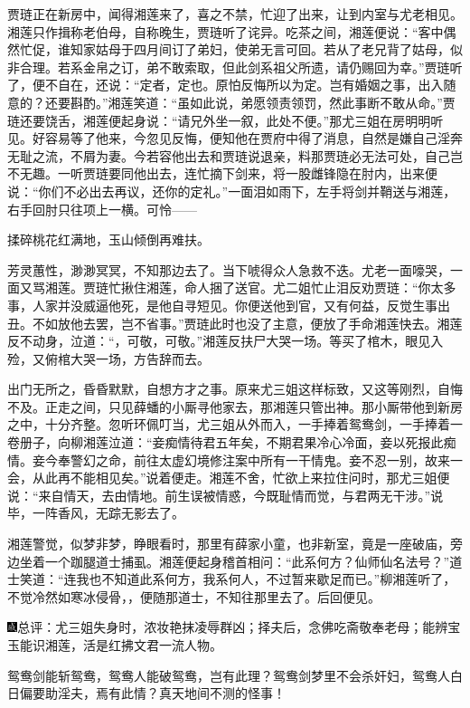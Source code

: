 贾琏正在新房中，闻得湘莲来了，喜之不禁，忙迎了出来，让到内室与尤老相见。湘莲只作揖称老伯母，自称晚生，贾琏听了诧异。吃茶之间，湘莲便说：``客中偶然忙促，谁知家姑母于四月间订了弟妇，使弟无言可回。若从了老兄背了姑母，似非合理。若系金帛之订，弟不敢索取，但此剑系祖父所遗，请仍赐回为幸。''贾琏听了，便不自在，还说：``定者，定也。原怕反悔所以为定。岂有婚姻之事，出入随意的？还要斟酌。''湘莲笑道：``虽如此说，弟愿领责领罚，然此事断不敢从命。''贾琏还要饶舌，湘莲便起身说：``请兄外坐一叙，此处不便。''那尤三姐在房明明听见。好容易等了他来，今忽见反悔，便知他在贾府中得了消息，自然是嫌自己淫奔无耻之流，不屑为妻。今若容他出去和贾琏说退亲，料那贾琏必无法可处，自己岂不无趣。一听贾琏要同他出去，连忙摘下剑来，将一股雌锋隐在肘内，出来便说：``你们不必出去再议，还你的定礼。''一面泪如雨下，左手将剑并鞘送与湘莲，右手回肘只往项上一横。可怜------

揉碎桃花红满地，玉山倾倒再难扶。

芳灵蕙性，渺渺冥冥，不知那边去了。当下唬得众人急救不迭。尤老一面嚎哭，一面又骂湘莲。贾琏忙揪住湘莲，命人捆了送官。尤二姐忙止泪反劝贾琏：``你太多事，人家并没威逼他死，是他自寻短见。你便送他到官，又有何益，反觉生事出丑。不如放他去罢，岂不省事。''贾琏此时也没了主意，便放了手命湘莲快去。湘莲反不动身，泣道：``，可敬，可敬。''湘莲反扶尸大哭一场。等买了棺木，眼见入殓，又俯棺大哭一场，方告辞而去。

出门无所之，昏昏默默，自想方才之事。原来尤三姐这样标致，又这等刚烈，自悔不及。正走之间，只见薛蟠的小厮寻他家去，那湘莲只管出神。那小厮带他到新房之中，十分齐整。忽听环佩叮当，尤三姐从外而入，一手捧着鸳鸯剑，一手捧着一卷册子，向柳湘莲泣道：``妾痴情待君五年矣，不期君果冷心冷面，妾以死报此痴情。妾今奉警幻之命，前往太虚幻境修注案中所有一干情鬼。妾不忍一别，故来一会，从此再不能相见矣。''说着便走。湘莲不舍，忙欲上来拉住问时，那尤三姐便说：``来自情天，去由情地。前生误被情惑，今既耻情而觉，与君两无干涉。''说毕，一阵香风，无踪无影去了。

湘莲警觉，似梦非梦，睁眼看时，那里有薛家小童，也非新室，竟是一座破庙，旁边坐着一个跏腿道士捕虱。湘莲便起身稽首相问：``此系何方？仙师仙名法号？''道士笑道：``连我也不知道此系何方，我系何人，不过暂来歇足而已。''柳湘莲听了，不觉冷然如寒冰侵骨，，便随那道士，不知往那里去了。后回便见。

{\includegraphics[width=3mm]{../Images/00005}\kaishu 总评：尤三姐失身时，浓妆艳抹凌辱群凶；择夫后，念佛吃斋敬奉老母；能辨宝玉能识湘莲，活是红拂文君一流人物。}

{\kaishu 鸳鸯剑能斩鸳鸯，鸳鸯人能破鸳鸯，岂有此理？鸳鸯剑梦里不会杀奸妇，鸳鸯人白日偏要助淫夫，焉有此情？真天地间不测的怪事！}


